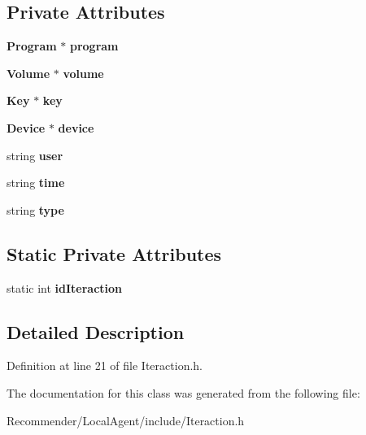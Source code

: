 \subsection*{Private Attributes}
\begin{CompactItemize}
\item 
{\bf Program} $\ast$ {\bf program}\label{classbr_1_1ufscar_1_1lince_1_1ginga_1_1recommender_1_1Iteraction_f9eacafabab46d63fbfe00ed61d7cd3d}

\item 
{\bf Volume} $\ast$ {\bf volume}\label{classbr_1_1ufscar_1_1lince_1_1ginga_1_1recommender_1_1Iteraction_79536ddde8c308522d2f923dc130eca1}

\item 
{\bf Key} $\ast$ {\bf key}\label{classbr_1_1ufscar_1_1lince_1_1ginga_1_1recommender_1_1Iteraction_53ba42873949ed19f570feb354c80069}

\item 
{\bf Device} $\ast$ {\bf device}\label{classbr_1_1ufscar_1_1lince_1_1ginga_1_1recommender_1_1Iteraction_ab5721a80a0db6d55599097ad8231fb0}

\item 
string {\bf user}\label{classbr_1_1ufscar_1_1lince_1_1ginga_1_1recommender_1_1Iteraction_e315dc7095b2ab26df1efb90a58f6345}

\item 
string {\bf time}\label{classbr_1_1ufscar_1_1lince_1_1ginga_1_1recommender_1_1Iteraction_f4ef0c9955005c3fe914b2c039d70dbf}

\item 
string {\bf type}\label{classbr_1_1ufscar_1_1lince_1_1ginga_1_1recommender_1_1Iteraction_cce15679d830831b0bbe8ebc2a60b2ca}

\end{CompactItemize}
\subsection*{Static Private Attributes}
\begin{CompactItemize}
\item 
static int {\bf idIteraction}\label{classbr_1_1ufscar_1_1lince_1_1ginga_1_1recommender_1_1Iteraction_fa9afc707605d5988a689e6a17a84e72}

\end{CompactItemize}


\subsection{Detailed Description}




Definition at line 21 of file Iteraction.h.

The documentation for this class was generated from the following file:\begin{CompactItemize}
\item 
Recommender/LocalAgent/include/Iteraction.h\end{CompactItemize}
